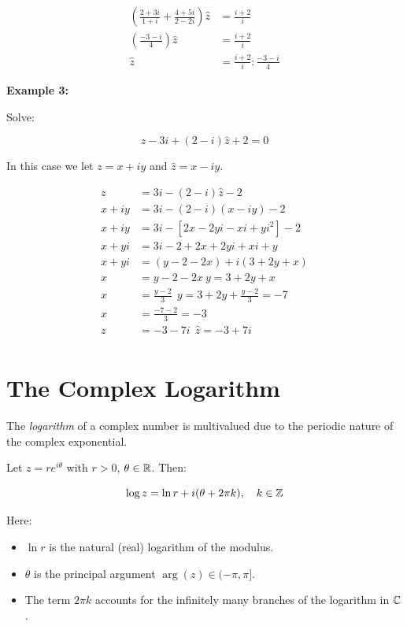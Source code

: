 \begin{align*}
	\left( \frac{2 + 3i}{1 + i} + \frac{4 + 5i}{2 - 2i}\right) \hat{z} &= \frac{i + 2}{i}\\
	\left( \frac{-3 -i}{4} \right) \hat{z} &= \frac{i + 2}{i}\\
	\hat{z} &= \frac{i + 2}{i} : \frac{-3 -i}{4}
\end{align*}

\textbf{Example 3:}

Solve:

\[
	z - 3i + (2 -i)\hat{z} + 2 = 0
\]

In this case we let \( z = x + iy \) and \( \hat{z} = x - iy \).

\begin{align*}
	z &= 3i - (2 - i)\hat{z} - 2\\
	x + iy &= 3i - (2 - i)(x - iy) - 2\\
	x + iy &= 3i - [2x - 2yi -xi +yi^2] - 2\\
	x + yi &= 3i - 2 + 2x + 2yi + xi + y\\
	x + yi &= (y - 2 -2x) + i(3 + 2y + x)\\
	x &= y - 2 -2x\ y = 3 + 2y + x\\
	x &= \frac{y - 2}{3}\ \ y = 3 + 2y + \frac{y-2}{3} = -7\\
	x &= \frac{-7 -2}{3} = -3\\
	z &= -3 -7i\ \ \hat{z} = -3 + 7i\\
\end{align*}

\section{The Complex Logarithm}

The \emph{logarithm} of a complex number is multivalued due to the periodic nature of the complex exponential.

Let \( z = re^{i\theta} \) with \( r > 0 \), \( \theta \in \mathbb{R} \). Then:

\[
	\log z = \ln r + i(\theta + 2\pi k), \quad k \in \mathbb{Z}
\]

Here:

\begin{itemize}
	
	\item \( \ln r \) is the natural (real) logarithm of the modulus.
	
	\item \( \theta \) is the principal argument \( \arg(z) \in (-\pi, \pi] \).
	
	\item The term \( 2\pi k \) accounts for the infinitely many branches of the logarithm in 
		  \( \mathbb{C} \).

		\end{itemize}

